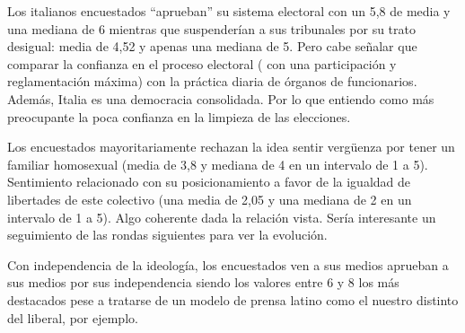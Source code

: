 \documentclass[
  12 pt,
  a4paper,
]{article}
\begin{document}
Los italianos encuestados ``aprueban'' su sistema electoral con un 5,8
de media y una mediana de 6 mientras que suspenderían a sus tribunales
por su trato desigual: media de 4,52 y apenas una mediana de 5. Pero
cabe señalar que comparar la confianza en el proceso electoral ( con una
participación y reglamentación máxima) con la práctica diaria de órganos
de funcionarios. Además, Italia es una democracia consolidada. Por lo
que entiendo como más preocupante la poca confianza en la limpieza de
las elecciones.

Los encuestados mayoritariamente rechazan la idea sentir vergüenza por
tener un familiar homosexual (media de 3,8 y mediana de 4 en un
intervalo de 1 a 5). Sentimiento relacionado con su posicionamiento a
favor de la igualdad de libertades de este colectivo (una media de 2,05
y una mediana de 2 en un intervalo de 1 a 5). Algo coherente dada la
relación vista. Sería interesante un seguimiento de las rondas
siguientes para ver la evolución.

Con independencia de la ideología, los encuestados ven a sus medios
aprueban a sus medios por sus independencia siendo los valores entre 6 y
8 los más destacados pese a tratarse de un modelo de prensa latino como
el nuestro distinto del liberal, por ejemplo.
\end{document}
